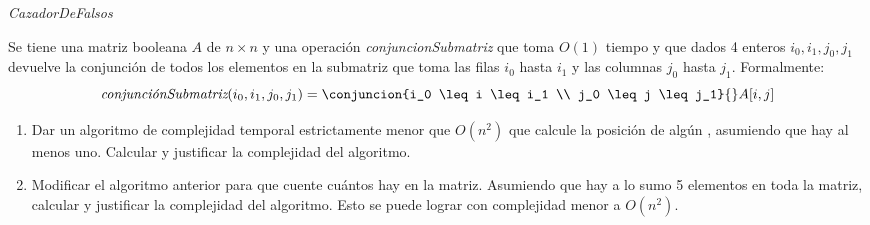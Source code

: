 \begin{enunciado}{\ejercicio[CazadorDeFalsos]}

  \textit{CazadorDeFalsos}

  Se tiene una matriz booleana $A$ de $n \times n$ y una operación \textit{conjuncionSubmatriz} que toma $O(1)$ tiempo
  y que dados 4 enteros $i_0, i_1, j_0, j_1$ devuelve la conjunción de todos los elementos en la submatriz que toma las filas $i_0$
  hasta $i_1$ y las columnas $j_0$ hasta $j_1$. Formalmente:
  $$
    \textit{conjunciónSubmatriz}(i_0, i_1, j_0, j_1) =
    \conjuncion{i_0 \leq i \leq i_1 \\ j_0 \leq j \leq j_1}{}
    A[i,j]
  $$

  \begin{enumerate}[label=\arabic*.]
    \item Dar un algoritmo de complejidad temporal estrictamente menor que $O(n^2)$ que calcule la posición de algún
          \false, asumiendo que hay al menos uno. Calcular y justificar la complejidad del algoritmo.

    \item Modificar el algoritmo anterior para que cuente cuántos \false hay en la matriz. Asumiendo que hay
          a lo sumo 5 elementos \false en toda la matriz, calcular y justificar la complejidad del algoritmo.
          Esto se puede lograr con complejidad menor a $O(n^2)$.
  \end{enumerate}
\end{enunciado}

